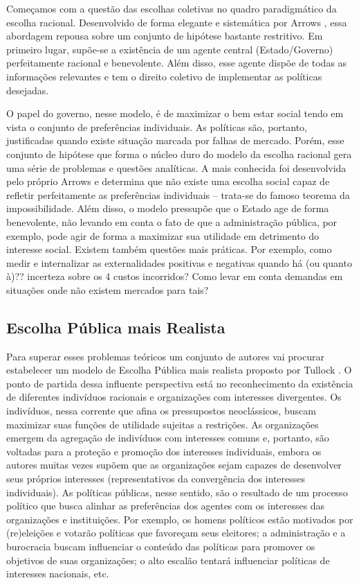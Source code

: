 Começamos com a questão das escolhas coletivas no quadro paradigmático da escolha racional. Desenvolvido de forma elegante e sistemática por Arrows \cite{Arrow1970SocialValues}, essa abordagem repousa sobre um conjunto de hipótese bastante restritivo. Em primeiro lugar, supõe-se a existência de um agente central (Estado/Governo) perfeitamente racional e benevolente. Além disso, esse agente dispõe de todas as informações relevantes e tem o direito coletivo de implementar as políticas desejadas. 

O papel do governo, nesse modelo, é de maximizar o bem estar social tendo em vista o conjunto de preferências individuais. As políticas são, portanto, justificadas quando existe situação marcada por falhas de mercado. Porém, esse conjunto de hipótese que forma o núcleo duro do modelo da escolha racional gera uma série de problemas e questões analíticas. A mais conhecida foi desenvolvida pelo próprio Arrows e determina que não existe uma escolha social capaz de refletir perfeitamente as preferências individuais – trata-se do famoso teorema da impossibilidade. Além disso, o modelo pressupõe que o Estado age de forma benevolente, não levando em conta o fato de que a administração pública, por exemplo, pode agir de forma a maximizar sua utilidade em detrimento do interesse social. Existem também questões mais práticas. Por exemplo, como medir e internalizar as externalidades positivas e negativas quando há (ou quanto à)?? incerteza sobre os 4 custos incorridos? Como levar em conta demandas em situações onde não existem mercados para tais?



\subsection{Escolha Pública mais Realista}

Para superar esses problemas teóricos um conjunto de autores vai procurar estabelecer um modelo de Escolha Pública mais realista proposto por Tullock \cite{Tullock1986TheBurocracy}. O ponto de partida dessa influente perspectiva está no reconhecimento da existência de diferentes indivíduos racionais e organizações com interesses divergentes. Os indivíduos, nessa corrente que afina os pressupostos neoclássicos, buscam maximizar suas funções de utilidade sujeitas a restrições. As organizações emergem da agregação de indivíduos com interesses comuns e, portanto, são voltadas para a proteção e promoção dos interesses individuais, embora os autores muitas vezes supõem que as organizações sejam capazes de desenvolver seus próprios interesses (representativos da convergência dos interesses individuais). As políticas públicas, nesse sentido, são o resultado de um processo político que busca alinhar as preferências dos agentes com os interesses das organizações e instituições. Por exemplo, os homens políticos estão motivados por (re)eleições e votarão políticas que favoreçam seus eleitores; a administração e a burocracia buscam influenciar o conteúdo das políticas para promover os objetivos de suas organizações; o alto escalão tentará influenciar políticas de interesses nacionais, etc.

